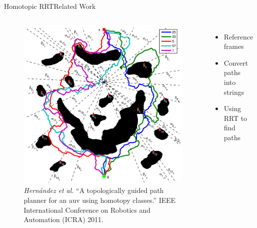 \begin{frame}{Homotopic RRT}{Related Work}

\begin{columns}

\begin{figure}
	\centering
	\includegraphics[width=\linewidth]{figure/homotopic_rrt}
	\caption{\tiny {\it Hernández et al.} ``A topologically guided path planner for an auv using homotopy classes.'' IEEE International Conference on Robotics and Automation (ICRA) 2011.}
\end{figure}

\begin{itemize}
\item Reference frames
\item Convert paths into strings
\item Using RRT to find paths
\end{itemize}
\end{columns}

\end{frame}

